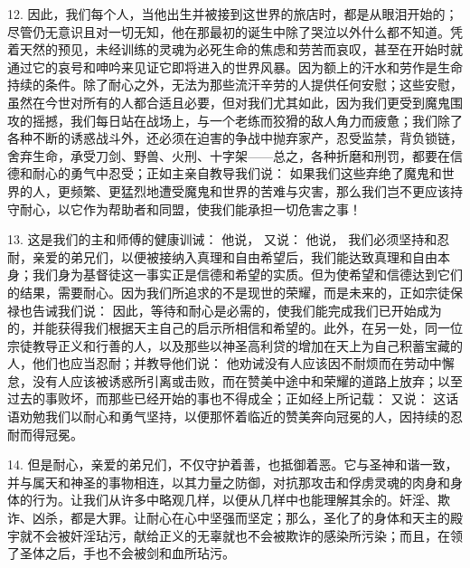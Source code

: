 12. 因此，我们每个人，当他出生并被接到这世界的旅店时，都是从眼泪开始的；尽管仍无意识且对一切无知，他在那最初的诞生中除了哭泣以外什么都不知道。凭着天然的预见，未经训练的灵魂为必死生命的焦虑和劳苦而哀叹，甚至在开始时就通过它的哀号和呻吟来见证它即将进入的世界风暴。因为额上的汗水和劳作是生命持续的条件。除了耐心之外，无法为那些流汗辛劳的人提供任何安慰；这些安慰，虽然在今世对所有的人都合适且必要，但对我们尤其如此，因为我们更受到魔鬼围攻的摇撼，我们每日站在战场上，与一个老练而狡猾的敌人角力而疲惫；我们除了各种不断的诱惑战斗外，还必须在迫害的争战中抛弃家产，忍受监禁，背负锁链，舍弃生命，承受刀剑、野兽、火刑、十字架——总之，各种折磨和刑罚，都要在信德和耐心的勇气中忍受；正如主亲自教导我们说：  如果我们这些弃绝了魔鬼和世界的人，更频繁、更猛烈地遭受魔鬼和世界的苦难与灾害，那么我们岂不更应该持守耐心，以它作为帮助者和同盟，使我们能承担一切危害之事！\par

13. 这是我们的主和师傅的健康训诫： 他说，  又说： 他说，  我们必须坚持和忍耐，亲爱的弟兄们，以便被接纳入真理和自由希望后，我们能达致真理和自由本身；我们身为基督徒这一事实正是信德和希望的实质。但为使希望和信德达到它们的结果，需要耐心。因为我们所追求的不是现世的荣耀，而是未来的，正如宗徒保禄也告诫我们说：  因此，等待和耐心是必需的，使我们能完成我们已开始成为的，并能获得我们根据天主自己的启示所相信和希望的。此外，在另一处，同一位宗徒教导正义和行善的人，以及那些以神圣高利贷的增加在天上为自己积蓄宝藏的人，他们也应当忍耐；并教导他们说： 他劝诫没有人应该因不耐烦而在劳动中懈怠，没有人应该被诱惑所引离或击败，而在赞美中途中和荣耀的道路上放弃；以至过去的事败坏，而那些已经开始的事也不得成全；正如经上所记载：  又说：  这话语劝勉我们以耐心和勇气坚持，以便那怀着临近的赞美奔向冠冕的人，因持续的忍耐而得冠冕。\par

14. 但是耐心，亲爱的弟兄们，不仅守护着善，也抵御着恶。它与圣神和谐一致，并与属天和神圣的事物相连，以其力量之防御，对抗那攻击和俘虏灵魂的肉身和身体的行为。让我们从许多中略观几样，以便从几样中也能理解其余的。奸淫、欺诈、凶杀，都是大罪。让耐心在心中坚强而坚定；那么，圣化了的身体和天主的殿宇就不会被奸淫玷污，献给正义的无辜就也不会被欺诈的感染所污染；而且，在领了圣体之后，手也不会被剑和血所玷污。\par

